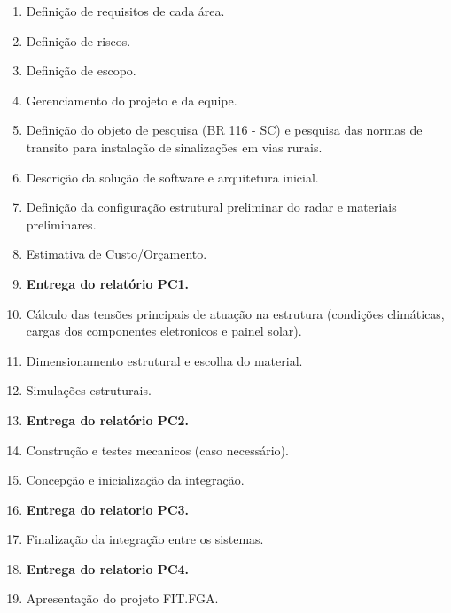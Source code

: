 \begin{enumerate}
	\item \label{geral1} Definição de requisitos de cada área.
	\item \label{geral2} Definição de riscos.
	\item \label{geral3} Definição de escopo.
	\item \label{geral4} Gerenciamento do projeto e da equipe.
	\item \label{est1} Definição do objeto de pesquisa (BR 116 - SC) e pesquisa das normas de transito para instalação de sinalizações em vias rurais.
	\item \label{sof1} Descrição da solução de software e arquitetura inicial.
	\item \label{anI} Definição da configuração estrutural preliminar do radar e materiais preliminares.
	\item \label{geral5} Estimativa de Custo/Orçamento.
	\item \label{anII} \textbf{Entrega do relatório PC1.} 
	\item \label{anIII} Cálculo das tensões principais de atuação na estrutura (condições climáticas, cargas dos componentes eletronicos e painel solar). 
	\item \label{dI} Dimensionamento estrutural e escolha do material.
	\item \label{dII}  Simulações estruturais.
	\item \label{dIII} \textbf{Entrega do relatório PC2.} 
	\item \label{esc-tcI}  Construção e testes mecanicos (caso necessário).
	\item \label{imI} Concepção e inicialização da integração.
	\item \label{imII} \textbf{Entrega do relatorio PC3.}
	\item \label{imIII} Finalização da integração entre os sistemas.
	\item \label{tec} \textbf{Entrega do relatorio PC4.}
	\item \label{esc-tcII} Apresentação do projeto FIT.FGA.
\end{enumerate}

